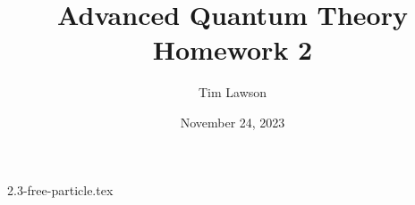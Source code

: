 \documentclass[a4paper]{extarticle}
\title{Advanced Quantum Theory\\
\large Homework 2}
\author{Tim Lawson}
\date{November 24, 2023}
\begin{document}
\maketitle

\setcounter{section}{2}
\setcounter{subsection}{2}
{2.3-free-particle.tex}
\end{document}
